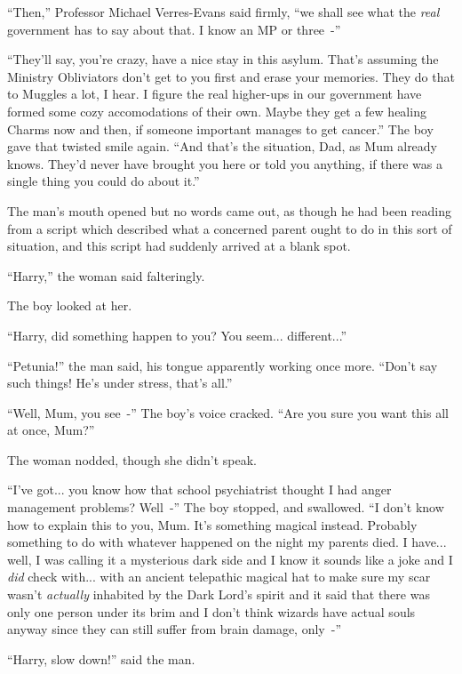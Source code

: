 ``Then,'' Professor Michael Verres-Evans said firmly, ``we shall see what the \emph{real} government has to say about that. I know an MP or three~-''

``They'll say, you're crazy, have a nice stay in this asylum. That's assuming the Ministry Obliviators don't get to you first and erase your memories. They do that to Muggles a lot, I hear. I figure the real higher-ups in our government have formed some cozy accomodations of their own. Maybe they get a few healing Charms now and then, if someone important manages to get cancer.'' The boy gave that twisted smile again. ``And that's the situation, Dad, as Mum already knows. They'd never have brought you here or told you anything, if there was a single thing you could do about it.''

The man's mouth opened but no words came out, as though he had been reading from a script which described what a concerned parent ought to do in this sort of situation, and this script had suddenly arrived at a blank spot.

``Harry,'' the woman said falteringly.

The boy looked at her.

``Harry, did something happen to you? You seem... different...''

``Petunia!'' the man said, his tongue apparently working once more. ``Don't say such things! He's under stress, that's all.''

``Well, Mum, you see~-'' The boy's voice cracked. ``Are you sure you want this all at once, Mum?''

The woman nodded, though she didn't speak.

``I've got... you know how that school psychiatrist thought I had anger management problems? Well~-'' The boy stopped, and swallowed. ``I don't know how to explain this to you, Mum. It's something magical instead. Probably something to do with whatever happened on the night my parents died. I have... well, I was calling it a mysterious dark side and I know it sounds like a joke and I \emph{did} check with... with an ancient telepathic magical hat to make sure my scar wasn't \emph{actually} inhabited by the Dark Lord's spirit and it said that there was only one person under its brim and I don't think wizards have actual souls anyway since they can still suffer from brain damage, only~-''

``Harry, slow down!'' said the man.

